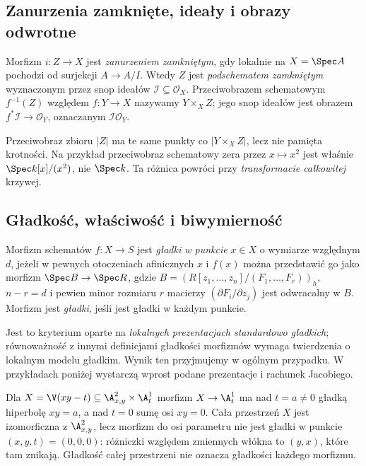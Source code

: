 \subsection{Zanurzenia zamknięte, ideały i obrazy odwrotne}

\begin{definicja}
Morfizm $i:Z\to X$ jest \emph{zanurzeniem zamkniętym}, gdy
lokalnie na $X=\Spec A$ pochodzi od surjekcji $A\to A/I$.
Wtedy $Z$ jest \emph{podschematem zamkniętym} wyznaczonym
przez snop ideałów $\mathcal I\subseteq\mathcal O_X$.
Przeciwobrazem schematowym $f^{-1}(Z)$ względem $f:Y\to X$
nazywamy $Y\times_X Z$; jego snop ideałów jest
obrazem $f^*\mathcal I\to\mathcal O_Y$, oznaczanym
$\mathcal I\mathcal O_Y$.
\end{definicja}

\begin{uwaga}
Przeciwobraz zbioru $|Z|$ ma te same punkty co
$|Y\times_X Z|$, lecz nie pamięta krotności. Na przykład
przeciwobraz schematowy zera przez $x\mapsto x^2$
jest właśnie $\Spec k[x]/(x^2)$, nie $\Spec k$.
Ta różnica powróci przy \emph{transformacie całkowitej} krzywej.
\end{uwaga}

\subsection{Gładkość, właściwość i biwymierność}

\begin{definicja}
\label{def:ga5-smooth}
Morfizm schematów $f:X\to S$ jest \emph{gładki w punkcie}
$x\in X$ o wymiarze względnym $d$, jeżeli w pewnych otoczeniach
afinicznych $x$ i $f(x)$ można przedstawić go jako morfizm
$\Spec B\to\Spec R$, gdzie
$B=(R[z_1,\ldots,z_n]/(F_1,\ldots,F_r))_h$,
$n-r=d$ i pewien minor rozmiaru $r$ macierzy
$(\partial F_i/\partial z_j)$ jest odwracalny w $B$.
Morfizm jest \emph{gładki}, jeśli jest gładki w każdym punkcie.
\end{definicja}

Jest to kryterium oparte na \emph{lokalnych prezentacjach
standardowo gładkich}; równoważność z innymi definicjami gładkości
morfizmów wymaga twierdzenia o lokalnym modelu gładkim.
Wynik ten przyjmujemy w ogólnym przypadku. W przykładach poniżej
wystarczą wprost podane prezentacje i rachunek Jacobiego.

\begin{przyklad}
Dla $X=\V(xy-t)\subseteq\A^2_{x,y}\times\A^1_t$
morfizm $X\to\A^1_t$ ma nad $t=a\ne0$ gładką hiperbolę
$xy=a$, a nad $t=0$ sumę osi $xy=0$. Cała przestrzeń $X$
jest izomorficzna z $\A^2_{x,y}$, lecz morfizm do osi parametru
nie jest gładki w punkcie $(x,y,t)=(0,0,0)$: różniczki
względem zmiennych włókna to $(y,x)$, które tam znikają.
Gładkość całej przestrzeni nie oznacza gładkości każdego morfizmu.
\end{przyklad}

